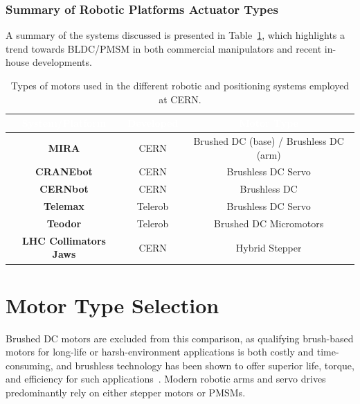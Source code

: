 \subsubsection*{Summary of Robotic Platforms Actuator Types}
A summary of the systems discussed is presented in Table~\ref{tab:cern-fleet-motor-topologies}, which highlights a trend towards BLDC/PMSM in both commercial manipulators and recent in-house developments.

\begin{table}[H]
    \centering
    \renewcommand{\arraystretch}{1.25}
    \setlength{\tabcolsep}{12pt}
    \begin{tabular}{>{\bfseries}c c c}
        \rowcolor{thesisblue}
        \textcolor{white}{\textbf{System/Platform}} & 
        \textcolor{white}{\textbf{Developed}} & 
        \textcolor{white}{\textbf{Motor Type}} \\
        \hline
        \rowcolor{thesislightgray}
        MIRA             & CERN    & Brushed DC (base) / Brushless DC (arm) \\

        \rowcolor{thesislightgray}
        CRANEbot         & CERN    & Brushless DC Servo \\
        CERNbot          & CERN    & Brushless DC \\

        \rowcolor{thesislightgray}
        Telemax          & Telerob & Brushless DC Servo \\
        Teodor           & Telerob & Brushed DC Micromotors \\

        \rowcolor{thesislightgray}
        LHC Collimators Jaws & CERN    & Hybrid Stepper \\
        \hline
    \end{tabular}
    \caption{Types of motors used in the different robotic and positioning systems employed at CERN.}
    \label{tab:cern-fleet-motor-topologies}
\end{table}

\section{Motor Type Selection}
\label{sec:motor-type-selection}
Brushed DC motors are excluded from this comparison, as qualifying brush-based motors for long-life or harsh-environment applications is both costly and time-consuming, and brushless technology has been shown to offer superior life, torque, and efficiency for such applications~\cite{nasa_motor_selection, acdcfan2024brushless}. Modern robotic arms and servo drives predominantly rely on either stepper motors or PMSMs.

